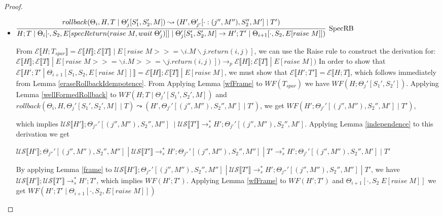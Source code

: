 \documentclass[9pt]{article}
\newcommand\specStep{\rightarrow_{s}}
\newcommand\parStep{\rightarrow_{p}}
\newcommand{\eval}[1]{E[#1]}
\newcommand{\erase}[1]{\mathcal{E}\llbracket #1 \rrbracket}
\newcommand{\unSpec}[1]{\mathcal{US} \llbracket #1 \rrbracket}
\newcommand{\specActions}[1]{\mathcal{SA} \llbracket #1 \rrbracket}
\begin{document}
\begin{proof}
\begin{itemize}
\begin{comment}
From $WF(T_{spar})$, we have $\exists T_1^+, \vec{i}.(T_1 \; | \; T_2) \specStep^* v\vec{i}.(T_1^+ \; | \; T_2') \specStep^* v\vec{i}.(T_1' \; | \; T_2'')$

Since $\specActions{T_2} = \specActions{T_2'}$, by Lemma \ref{independence}, we have: 
$v\vec{i}.(T_1 \; | \; T_2) \specStep^* v\vec{i}.(T_1 \; | \; T_2') \specStep^* v\vec{i}.(T_1^+ \; | \; T_2') \specStep^* v\vec{i}.(T_1' \; | \; T_2'')$.  Since $\unSpec{T_{spar}} = v\vec{i}.(T_1 \; | \; T_2')$ and $T_{spar}' = v\vec{i}.(T_1' \; | \; T_2'')$, we have $WF(T_{spar}')$.  
\end{itemize}
\end{comment} %

\item $\infer[\text{SpecRB}]{H; T \; | \; \Theta_i[\cdot, S_2, \eval{specReturn(raise \; M, wait \; \Theta_j')}] \; | \; \Theta_j'[S_1', S_2', M] \rightarrow H'; T' \; | \;  \Theta_{i+1}[\cdot, S_2, \eval{raise \; M}])}{rollback(\Theta_i, H, T \; | \; \Theta_j'[S_1', S_2', M]) \leadsto (H', \Theta_{j'}'[\cdot : (j'', M''), S_2'', M'] \; | \; T')}$

From $\erase{H; T_{spar}} = \erase{H}; \erase{T} \; | \; \eval{raise \; M >>= \backslash i. M \backslash j. return(i, j)}$, we can use the Raise rule to construct the derivation for:
$\erase{H}; \erase{T} \; | \; \eval{raise \; M >>= \backslash i. M >>= \backslash j. return(i, j)}) \parStep \erase{H}; \erase{T} \; | \; \eval{raise \; M})$ In order to show that $\erase{H'; T' \; | \; \Theta_{i+1}[S_1, S_2, \eval{raise \; M}]} = \erase{H}; \erase{T} \; | \; \eval{raise \; M}$, we must show that $\erase{H'; T'} = \erase{H; T}$, which follows immediately from Lemma \ref{eraseRollbackIdempotence}.  From Applying Lemma \ref{wfFrame} to $WF(T_{spar})$ we have $WF(H; \Theta_j'[S_1', S_2'])$.  Applying Lemma \ref{wellFormedRollback} to $WF(H; T \; | \; \Theta_j'[S_1', S_2', M])$ and $rollback(\Theta_i, H, \Theta_j'[S_1', S_2', M] \; | \; T) \leadsto (H', \Theta_{j'}'[(j'', M''), S_2'', M'] \; | \; T')$, we get $WF(H'; \Theta_{j'}'[(j'', M''), S_2'', M'] \;|\; T')$, 

which implies $\unSpec{H'}; \Theta_{j''}'[(j'', M''), S_2'', M''] \; \; | \; \unSpec{T'} \specStep^* H'; \Theta_{j'}'[(j'', M''), S_2'', M']$.  Applying Lemma \ref{independence} to this derivation we get 

$\unSpec{H'}; \Theta_{j''}'[(j'', M''), S_2'', M''] \; | \; \unSpec{T'} \specStep^* H'; \Theta_{j''}'[(j'', M''), S_2'', M''] \; | \; T' \specStep^* H'; \Theta_{j'}'[(j'', M''), S_2'', M'] \; | \; T'$

By applying Lemma \ref{frame} to  $\unSpec{H'}; \Theta_{j''}'[(j'', M''), S_2'', M''] \; | \; \unSpec{T'} \specStep^* H'; \Theta_{j''}'[(j'', M''), S_2'', M''] \; | \; T'$, we have $\unSpec{H'}; \unSpec{T'} \specStep^* H'; T'$, which implies $WF(H'; T')$.  Applying Lemma \ref{wfFrame} to $WF(H'; T')$ and $\Theta_{i+1}[\cdot, S_2 \; \eval{raise \; M}]$ we get $WF(H'; T' \; | \; \Theta_{i+1}[\cdot, S_2, \eval{raise \; M}])$

\end{itemize}
\end{proof}
\end{document}
